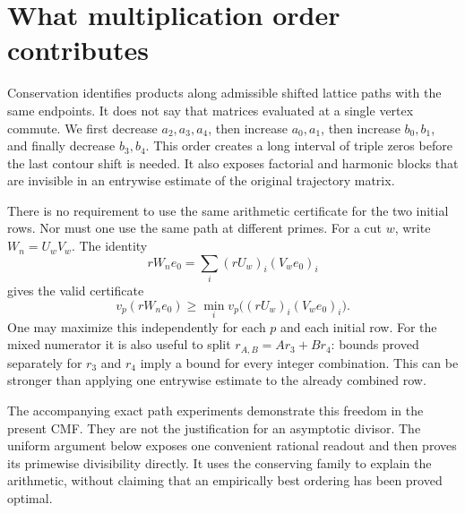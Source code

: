 \documentclass[11pt]{article}
\begin{document}
\section{What multiplication order contributes}
Conservation identifies products along admissible shifted lattice paths
with the same endpoints. It does not say that matrices evaluated at a
single vertex commute. We first decrease $a_2,a_3,a_4$, then increase
$a_0,a_1$, then increase $b_0,b_1$, and finally decrease $b_3,b_4$.
This order creates a long interval of triple zeros before the last
contour shift is needed. It also exposes factorial and harmonic blocks
that are invisible in an entrywise estimate of the original trajectory
matrix.

There is no requirement to use the same arithmetic certificate for the
two initial rows. Nor must one use the same path at different primes.
For a cut $w$, write $W_n=U_wV_w$. The identity
\[
 rW_ne_0=\sum_i(rU_w)_i(V_we_0)_i
\]
gives the valid certificate
\[
 v_p(rW_ne_0)\ge \min_i v_p\bigl((rU_w)_i(V_we_0)_i\bigr).
\]
One may maximize this independently for each $p$ and each initial row.
For the mixed numerator it is also useful to split
$r_{A,B}=Ar_3+Br_4$: bounds proved separately for $r_3$ and $r_4$ imply a
bound for every integer combination. This can be stronger than applying
one entrywise estimate to the already combined row.

The accompanying exact path experiments demonstrate this freedom in the
present CMF. They are not the justification for an asymptotic divisor.
The uniform argument below exposes one convenient rational readout and
then proves its primewise divisibility directly. It uses the conserving
family to explain the arithmetic, without claiming that an empirically
best ordering has been proved optimal.

\end{document}
